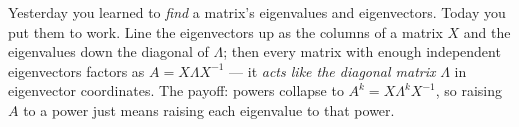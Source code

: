 \documentclass[10pt]{article}
\begin{document}
\vspace{0.10in}

\begin{remindbox}
\small Yesterday you learned to \emph{find} a matrix's eigenvalues and eigenvectors. Today you put them
to work. Line the eigenvectors up as the columns of a matrix $X$ and the eigenvalues down the diagonal
of $\Lambda$; then every matrix with enough independent eigenvectors factors as
$A=X\Lambda X^{-1}$ --- it \emph{acts like the diagonal matrix} $\Lambda$ in eigenvector coordinates. The
payoff: powers collapse to $A^k=X\Lambda^k X^{-1}$, so raising $A$ to a power just means raising each
eigenvalue to that power.
\end{remindbox}
\end{document}
